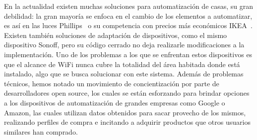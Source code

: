 En la actualidad existen muchas soluciones para automatización de casas, su gran debilidad: la gran mayoría se enfoca en el cambio de los elementos a automatizar, es así en las luces Phillips~\cite{phillips-lighting} o su competencia con precios más económicos IKEA~\cite{ikea-lighting}. Existen también soluciones de adaptación de dispositivos, como el mismo dispositivo Sonoff, pero su código cerrado no deja realizarle modificaciones a la implementación. 
Uno de los problemas a los que se enfrentan estos dispositivos es que el alcance de WiFi nunca cubre la totalidad del área habitada donde está instalado, algo que se busca solucionar con este sistema. Además de problemas técnicos, hemos notado un movimiento de concientización por parte de desarrolladores open source, los cuales se están esforzando para brindar opciones a los dispositivos de automatización de grandes empresas como Google o Amazon, las cuales utilizan datos obtenidos para sacar provecho de los mismos, realizando perfiles de compra e incitando a adquirir productos que otros usuarios similares han comprado.

